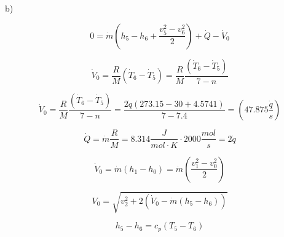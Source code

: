 b)

\[
0 = \dot{m} (h_5 - h_6 + \frac{v_5^2 - v_6^2}{2}) + \dot{Q} - \dot{V}_0
\]

\[
\dot{V}_0 = \frac{R}{M} (\dot{T}_6 - \dot{T}_5) = \frac{R}{M} \frac{(\dot{T}_6 - \dot{T}_5)}{7 - n}
\]

\[
\dot{V}_0 = \frac{R}{M} \frac{(\dot{T}_6 - \dot{T}_5)}{7 - n} = \frac{2 \dot{q} (273.15 - 30 + 4.5741)}{7 - 7.4} = (47.875 \frac{\dot{q}}{s})
\]

\[
\dot{Q} = \dot{m} \frac{R}{M} = 8.314 \frac{J}{mol \cdot K} \cdot 2000 \frac{mol}{s} = 2 \dot{q}
\]

\[
\dot{V}_0 = \dot{m} (h_1 - h_0) = \dot{m} (\frac{v_1^2 - v_0^2}{2})
\]

\[
V_0 = \sqrt{v_2^2 + 2 (\dot{V}_0 - \dot{m} (h_5 - h_6))}
\]

\[
h_5 - h_6 = c_p (T_5 - T_6)
\]
